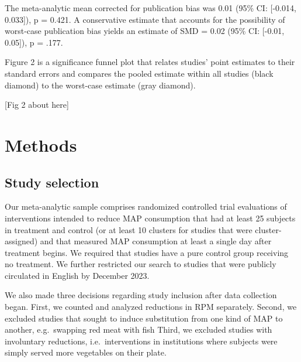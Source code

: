 \documentclass[sn-nature,referee,pdflatex]{sn-jnl}
\begin{document}
The meta-analytic mean corrected for publication bias \citep{hedges1992}
was 0.01 (95\% CI: {[}-0.014, 0.033{]}), p = 0.421. A conservative
estimate that accounts for the possibility of worst-case publication
bias \citep{mathur2024} yields an estimate of SMD = 0.02 (95\% CI:
{[}-0.01, 0.05{]}), p = .177.

Figure 2 is a significance funnel plot \citep{mathur2020} that relates
studies' point estimates to their standard errors and compares the
pooled estimate within all studies (black diamond) to the worst-case
estimate (gray diamond).

\begin{center}
[Fig 2 about here]
\end{center}

\section{Methods}\label{sec3}

\subsection{Study selection}\label{sec3.1}

Our meta-analytic sample comprises randomized controlled trial
evaluations of interventions intended to reduce MAP consumption that had
at least 25 subjects in treatment and control (or at least 10 clusters
for studies that were cluster-assigned) and that measured MAP
consumption at least a single day after treatment begins. We required
that studies have a pure control group receiving no treatment. We
further restricted our search to studies that were publicly circulated
in English by December 2023.

We also made three decisions regarding study inclusion after data
collection began. First, we counted and analyzed reductions in RPM
separately. Second, we excluded studies that sought to induce
substitution from one kind of MAP to another, e.g.~swapping red meat
with fish Third, we excluded studies with involuntary reductions,
i.e.~interventions in institutions where subjects were simply served
more vegetables on their plate.
\end{document}
